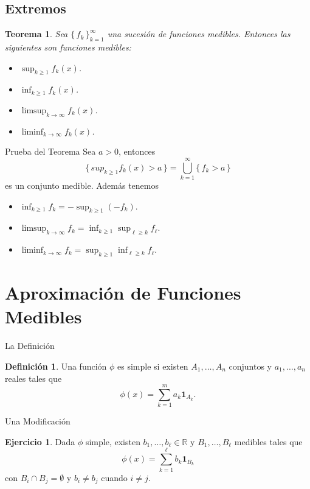 \documentclass[utf8]{beamer}
\theoremstyle{plain}
\newtheorem{Th}{Teorema}               %
\theoremstyle{definition}
\newtheorem{Def}{Definición}           %
\newtheorem{Ej}{Ejercicio}             %
\theoremstyle{remark}
\numberwithin{equation}{section}
\newcommand{\bR}{\mathbb{R}}    %
\newcommand{\set}[1]{\{\,#1\,\}}    %
\renewcommand{\geq}{\geqslant}          %
\renewcommand{\l}{\ell}                   %
\newcommand{\ind}{\mathbf{1}}       %
\newcommand{\suck}{_{k=1}^\infty} %
\renewcommand{\.}{\Cdot}                %
\begin{document}
\subsection{Extremos}

\begin{frame}
  \begin{Th}\label{th:ExtremosMedibles}
    Sea $\set{f_k}\suck$ una sucesión de funciones medibles. Entonces las siguientes son funciones medibles: 
    \begin{itemize}
      \item $\sup_{k\geq 1}f_k(x)$.
      \item $\inf_{k\geq 1}f_k(x)$.
      \item $\limsup_{k\to\infty}f_k(x)$.
      \item $\liminf_{k\to\infty}f_k(x)$.
    \end{itemize}
  \end{Th}
\end{frame}

\begin{frame}{Prueba del Teorema}
  Sea $a>0$, entonces 
  $$\set{sup_{k\geq 1}f_k(x)>a}=\bigcup\suck\set{f_k>a}$$
  es un conjunto medible. Además tenemos 
  \begin{itemize}
    \item $\inf_{k\geq 1}f_k=-\sup_{k\geq 1}(-f_k)$.
    \item $\limsup_{k\to\infty}f_k=\inf_{k\geq 1}\sup_{\l\geq k}f_\l$.
    \item $\liminf_{k\to\infty}f_k=\sup_{k\geq 1}\inf_{\l\geq k}f_\l$.
  \end{itemize}
\end{frame}

\section{Aproximación de Funciones Medibles}

\begin{frame}{La Definición}
  \begin{Def}\label{def:funcSimple}
    Una función $\phi$ es \alert{simple} si existen $A_1,\dots,A_n$ conjuntos y $a_1,\dots, a_n$ reales tales que 
    $$\phi(x)=\sum_{k=1}^ma_k\ind_{A_k}.$$
  \end{Def}
\end{frame}

\begin{frame}{Una Modificación}
  \begin{Ej}\label{ej:simplesDisjuntos}
    Dada $\phi$ simple, existen $b_1,\dots,b_\l\in\bR$ y $B_1,\dots,B_\l$ medibles tales que 
    $$\phi(x)=\sum_{k=1}^\l b_k\ind_{B_k}$$
    con $B_i\cap B_j=\emptyset$ y $b_i\neq b_j$ cuando $i\neq j$.
  \end{Ej}
\end{frame}
\end{document}

